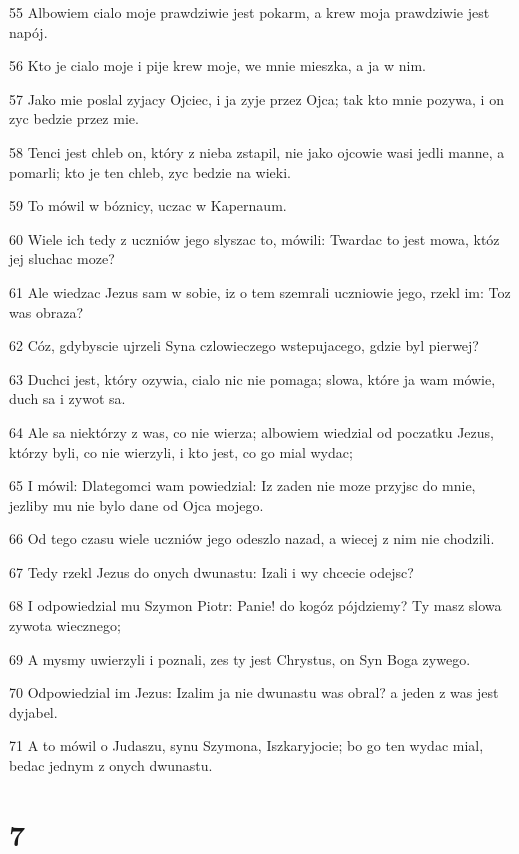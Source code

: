 \par 55 Albowiem cialo moje prawdziwie jest pokarm, a krew moja prawdziwie jest napój.
\par 56 Kto je cialo moje i pije krew moje, we mnie mieszka, a ja w nim.
\par 57 Jako mie poslal zyjacy Ojciec, i ja zyje przez Ojca; tak kto mnie pozywa, i on zyc bedzie przez mie.
\par 58 Tenci jest chleb on, który z nieba zstapil, nie jako ojcowie wasi jedli manne, a pomarli; kto je ten chleb, zyc bedzie na wieki.
\par 59 To mówil w bóznicy, uczac w Kapernaum.
\par 60 Wiele ich tedy z uczniów jego slyszac to, mówili: Twardac to jest mowa, któz jej sluchac moze?
\par 61 Ale wiedzac Jezus sam w sobie, iz o tem szemrali uczniowie jego, rzekl im: Toz was obraza?
\par 62 Cóz, gdybyscie ujrzeli Syna czlowieczego wstepujacego, gdzie byl pierwej?
\par 63 Duchci jest, który ozywia, cialo nic nie pomaga; slowa, które ja wam mówie, duch sa i zywot sa.
\par 64 Ale sa niektórzy z was, co nie wierza; albowiem wiedzial od poczatku Jezus, którzy byli, co nie wierzyli, i kto jest, co go mial wydac;
\par 65 I mówil: Dlategomci wam powiedzial: Iz zaden nie moze przyjsc do mnie, jezliby mu nie bylo dane od Ojca mojego.
\par 66 Od tego czasu wiele uczniów jego odeszlo nazad, a wiecej z nim nie chodzili.
\par 67 Tedy rzekl Jezus do onych dwunastu: Izali i wy chcecie odejsc?
\par 68 I odpowiedzial mu Szymon Piotr: Panie! do kogóz pójdziemy? Ty masz slowa zywota wiecznego;
\par 69 A mysmy uwierzyli i poznali, zes ty jest Chrystus, on Syn Boga zywego.
\par 70 Odpowiedzial im Jezus: Izalim ja nie dwunastu was obral? a jeden z was jest dyjabel.
\par 71 A to mówil o Judaszu, synu Szymona, Iszkaryjocie; bo go ten wydac mial, bedac jednym z onych dwunastu.

\chapter{7}

